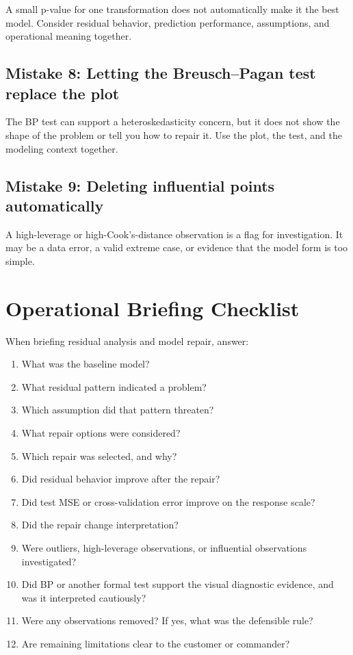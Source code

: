 {A small p-value for one transformation does not automatically make it the best model.  Consider residual behavior, prediction performance, assumptions, and operational meaning together.

\subsection*{Mistake 8: Letting the Breusch--Pagan test replace the plot}

The BP test can support a heteroskedasticity concern, but it does not show the shape of the problem or tell you how to repair it.  Use the plot, the test, and the modeling context together.

\subsection*{Mistake 9: Deleting influential points automatically}

A high-leverage or high-Cook's-distance observation is a flag for investigation.  It may be a data error, a valid extreme case, or evidence that the model form is too simple.

\section{Operational Briefing Checklist}

When briefing residual analysis and model repair, answer:
\begin{enumerate}
  \item What was the baseline model?
  \item What residual pattern indicated a problem?
  \item Which assumption did that pattern threaten?
  \item What repair options were considered?
  \item Which repair was selected, and why?
  \item Did residual behavior improve after the repair?
  \item Did test MSE or cross-validation error improve on the response scale?
  \item Did the repair change interpretation?
  \item Were outliers, high-leverage observations, or influential observations investigated?
  \item Did BP or another formal test support the visual diagnostic evidence, and was it interpreted cautiously?
  \item Were any observations removed?  If yes, what was the defensible rule?
  \item Are remaining limitations clear to the customer or commander?
\end{enumerate}

}
